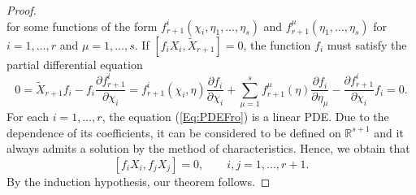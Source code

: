 \documentclass[10pt,a4paper]{amsart}
\begin{document}
\begin{proof}
$$	$$
	for some functions of the form $f_{r+1}^i(\chi_i,\eta_1,\ldots,\eta_s)$ and $f^\mu_{r+1}(\eta_1,\ldots,\eta_s)$ for $i=1,\ldots,r$ and   $\mu=1,\ldots,s$. 
	If $[f_iX_i,\widetilde{X}_{r+1}]=0$, the function $f_i$ must satisfy the partial differential equation
	\begin{equation}\label{Eq:PDEFro}
		0=\widetilde {X}_{r+1}f_i-f_i\frac{\partial f^i_{r+1}}{\partial \chi_i}=f^i_{r+1}(\chi_i,\eta)\frac{\partial f_i}{\partial \chi_i}+\sum_{\mu=1}^sf^\mu_{r+1}(\eta)\frac{\partial f_i}{\partial \eta_\mu}-\frac{\partial f^i_{r+1}}{\partial \chi_i}f_i=0.
	\end{equation}
	For each $i=1,\ldots,r$, the equation (\ref{Eq:PDEFro}) is a linear PDE. Due to the dependence of its coefficients, it can be considered to be defined on $\mathbb{R}^{s+1}$ and it always admits  a solution by the method of characteristics. Hence, we obtain that
	$$
	[f_iX_i,f_jX_j]=0,\qquad i,j=1,\ldots,r+1.
	$$
	By the induction hypothesis, our theorem follows.
\end{proof}
\end{document}
